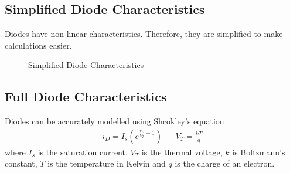 \documentclass[oneside]{book}
\begin{document}
                \subsection{Simplified Diode Characteristics}
                    Diodes have non-linear characteristics. Therefore, they are simplified to make calculations easier.
                    \begin{figure}[H]
                        \centering
                        \caption{Simplified Diode Characteristics}
                    \end{figure}
                \subsection{Full Diode Characteristics}
                    Diodes can be accurately modelled using Shcokley's equation
                    \begin{align*}
                        i_D = I_s \left( e^{\frac{v_D}{V_T} -1} \right) && V_T = \frac{kT}{q}
                    \end{align*}
                    where $I_s$ is the saturation current, $V_T$ is the thermal voltage, $k$ is Boltzmann's constant, $T$ is the temperature in Kelvin and $q$ is the charge of an electron.
\end{document}
